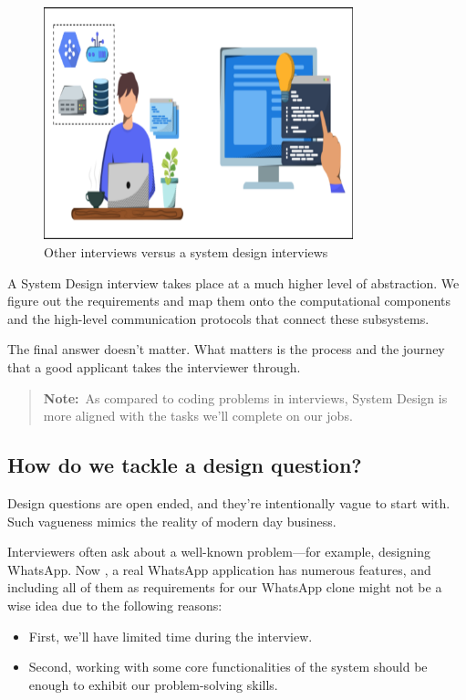 \begin{figure}[htbp]
 \centering
 \includegraphics[width=0.8\textwidth]{Images/chapter_1/section_4771234193080320/5859851702239232.png}
 \caption{Other interviews versus a system design interviews}
\end{figure}

A System Design interview takes place at a much higher level of abstraction. We figure out the requirements and map them onto the computational components and the high-level communication protocols that connect these subsystems.

The final answer doesn't matter. What matters is the process and the journey that a good applicant takes the interviewer through.
\begin{quote}
\textbf{Note:}~As compared to coding problems in interviews, System Design is more aligned with the tasks we'll complete on our jobs.
\end{quote}
\subsection{How do we tackle a design question?}\label{V2_cowfLOR7_6lrU-55Oc}

Design questions are open ended, and they're intentionally vague to start with. Such vagueness mimics the reality of modern day business.

Interviewers often ask about a well-known problem---for example, designing WhatsApp. Now , a real WhatsApp application has numerous features, and including all of them as requirements for our WhatsApp clone might not be a wise idea due to the following reasons:

\begin{itemize}
\item
{}\label{0uEfb-y7Eteyhlt2HMQKn}
First, we'll have limited time during the interview.
\item
{}\label{TGDVjaDwtQ0YTnO7z7MNh}
Second, working with some core functionalities of the system should be enough to exhibit our problem-solving skills.
\end{itemize}

